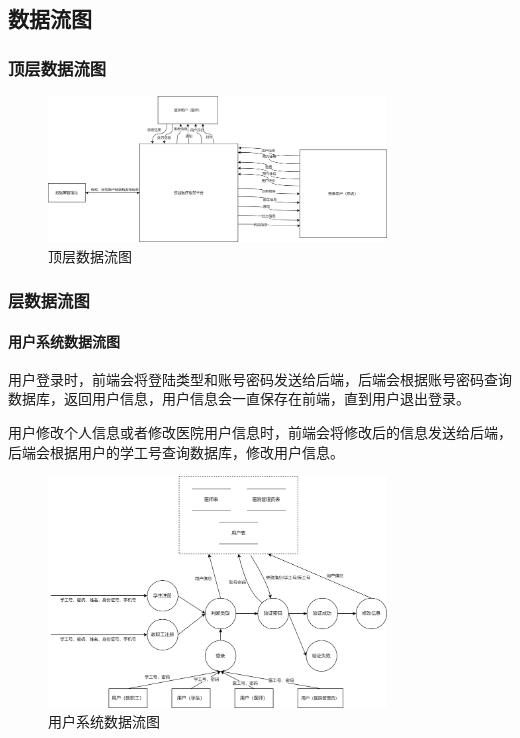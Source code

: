 \documentclass{article}
\begin{document}
\subsection{数据流图}

\subsubsection{顶层数据流图}

\begin{figure}[H]
    \centering
    \includegraphics[width=0.8\textwidth]{images/all_dataflow.png}
    \caption{顶层数据流图}
\end{figure}

\subsubsection{层数据流图}

\paragraph{用户系统数据流图}

用户登录时，前端会将登陆类型和账号密码发送给后端，后端会根据账号密码查询数据库，返回用户信息，用户信息会一直保存在前端，直到用户退出登录。

用户修改个人信息或者修改医院用户信息时，前端会将修改后的信息发送给后端，后端会根据用户的学工号查询数据库，修改用户信息。

\begin{figure}[H]
    \centering
    \includegraphics[width=0.8\textwidth]{images/user_dataflow.png}
    \caption{用户系统数据流图}
\end{figure}
\end{document}

